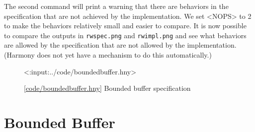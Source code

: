\documentclass{report}
\newcommand{\harmonylink}[1]{%
[\href{https://harmony.cs.cornell.edu/#1}{\underline{#1}}]%
}
\newenvironment{code}{
\tcolorbox
}{
\endtcolorbox
}
\begin{document}
The second command will print a warning that there are behaviors in the
specification that are not achieved by the implementation.
We set <{NOPS}> to 2 to make the behaviors relatively small and easier
to compare.
It is now possible to compare the outputs in \texttt{rwspec.png}
and \texttt{rwimpl.png} and see what behaviors are allowed by the
specification that are not allowed by the implementation.
(Harmony does not yet have a mechanism to do this automatically.)

\begin{figure}
\begin{code}
<{:input:../code/boundedbuffer.hny}>
\end{code}
\caption{\harmonylink{code/boundedbuffer.hny} Bounded buffer specification}
\label{fig:boundedbuffer}
\end{figure}

\section{Bounded Buffer}
%
%
%
\end{document}
